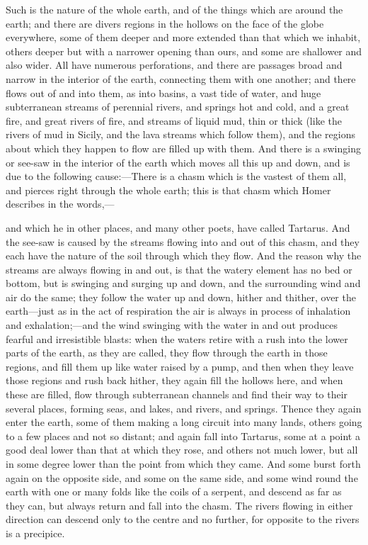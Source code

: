 \documentclass[11pt,letter]{article}
\begin{document}
\par  Such is the nature of the whole earth, and of the things which are around the earth; and there are divers regions in the hollows on the face of the globe everywhere, some of them deeper and more extended than that which we inhabit, others deeper but with a narrower opening than ours, and some are shallower and also wider. All have numerous perforations, and there are passages broad and narrow in the interior of the earth, connecting them with one another; and there flows out of and into them, as into basins, a vast tide of water, and huge subterranean streams of perennial rivers, and springs hot and cold, and a great fire, and great rivers of fire, and streams of liquid mud, thin or thick (like the rivers of mud in Sicily, and the lava streams which follow them), and the regions about which they happen to flow are filled up with them. And there is a swinging or see-saw in the interior of the earth which moves all this up and down, and is due to the following cause:—There is a chasm which is the vastest of them all, and pierces right through the whole earth; this is that chasm which Homer describes in the words,—
 
\par  and which he in other places, and many other poets, have called Tartarus. And the see-saw is caused by the streams flowing into and out of this chasm, and they each have the nature of the soil through which they flow. And the reason why the streams are always flowing in and out, is that the watery element has no bed or bottom, but is swinging and surging up and down, and the surrounding wind and air do the same; they follow the water up and down, hither and thither, over the earth—just as in the act of respiration the air is always in process of inhalation and exhalation;—and the wind swinging with the water in and out produces fearful and irresistible blasts: when the waters retire with a rush into the lower parts of the earth, as they are called, they flow through the earth in those regions, and fill them up like water raised by a pump, and then when they leave those regions and rush back hither, they again fill the hollows here, and when these are filled, flow through subterranean channels and find their way to their several places, forming seas, and lakes, and rivers, and springs. Thence they again enter the earth, some of them making a long circuit into many lands, others going to a few places and not so distant; and again fall into Tartarus, some at a point a good deal lower than that at which they rose, and others not much lower, but all in some degree lower than the point from which they came. And some burst forth again on the opposite side, and some on the same side, and some wind round the earth with one or many folds like the coils of a serpent, and descend as far as they can, but always return and fall into the chasm. The rivers flowing in either direction can descend only to the centre and no further, for opposite to the rivers is a precipice.
\end{document}
